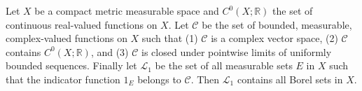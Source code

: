 \begin{lemma}
    \label{lmm:hall-prblm-8.3.3b}
    \leanok
    Let $X$ be a compact metric measurable space and $C^0(X; \mathbb{R})$ the set of continuous real-valued functions on $X$. Let $\mathcal{C}$ be the set of bounded, measurable, complex-valued functions on $X$ such that (1) $\mathcal{C}$ is a complex vector space, (2) $\mathcal{C}$ contains $C^0(X; \mathbb{R})$, and (3) $\mathcal{C}$ is closed under pointwise limits of uniformly bounded sequences. Finally let $\mathcal{L}_1$ be the set of all measurable sets $E$ in $X$ such that the indicator function $1_E$ belongs to $\mathcal{C}$. Then $\mathcal{L}_1$ contains all Borel sets in $X$.
\end{lemma}

